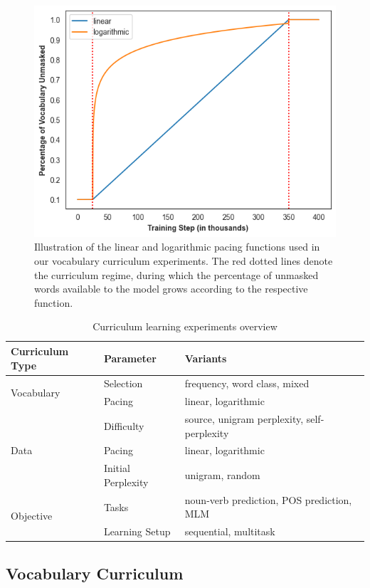 \begin{figure}
    \centering
    \includegraphics[width=.70\textwidth]{chapters/climb/figures/pacing_fns.png}
    \caption{Illustration of the linear and logarithmic pacing functions used in our vocabulary curriculum experiments. The red dotted lines denote the curriculum regime, during which the percentage of unmasked words available to the model grows according to the respective function.}
    \label{fig:pacing_fn}
\end{figure}

\begin{table}
\vspace{-10mm}
\centering
\small
\begin{tabular}{lll}
\toprule
\textbf{Curriculum Type} & \textbf{Parameter} &\textbf{Variants} \\
\midrule
 \multirow{2}{*}{Vocabulary} & Selection & frequency, word class, mixed \\
 & Pacing & linear, logarithmic \\
 \midrule
 \multirow{3}{*}{Data} & Difficulty & source, unigram perplexity, self-perplexity \\
 & Pacing & linear, logarithmic \\
 & Initial Perplexity & unigram, random \\
  \midrule
 \multirow{2}{*}{Objective} & Tasks & noun-verb prediction, POS prediction, MLM\\
 & Learning Setup & sequential, multitask \\
\bottomrule
\end{tabular}
\caption{\label{tbl:configurations} Curriculum learning experiments overview}
\end{table}


\subsection{Vocabulary Curriculum}
\label{subsec:vocab-cl}

